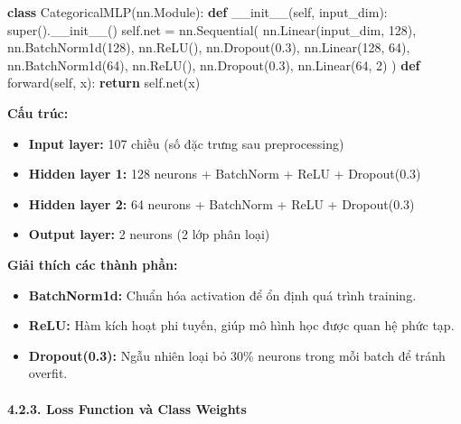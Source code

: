\documentclass[
]{article}
\newenvironment{Shaded}{}{}
\newcommand{\BuiltInTok}[1]{\textcolor[rgb]{0.00,0.50,0.00}{#1}}
\newcommand{\ControlFlowTok}[1]{\textcolor[rgb]{0.00,0.44,0.13}{\textbf{#1}}}
\newcommand{\DecValTok}[1]{\textcolor[rgb]{0.25,0.63,0.44}{#1}}
\newcommand{\FloatTok}[1]{\textcolor[rgb]{0.25,0.63,0.44}{#1}}
\newcommand{\FunctionTok}[1]{\textcolor[rgb]{0.02,0.16,0.49}{#1}}
\newcommand{\KeywordTok}[1]{\textcolor[rgb]{0.00,0.44,0.13}{\textbf{#1}}}
\newcommand{\NormalTok}[1]{#1}
\newcommand{\OperatorTok}[1]{\textcolor[rgb]{0.40,0.40,0.40}{#1}}
\newcommand{\VariableTok}[1]{\textcolor[rgb]{0.10,0.09,0.49}{#1}}
\providecommand{\tightlist}{%
  \setlength{\itemsep}{0pt}\setlength{\parskip}{0pt}}
\begin{document}
\begin{Shaded}
\begin{Highlighting}[]
\KeywordTok{class}\NormalTok{ CategoricalMLP(nn.Module):}
    \KeywordTok{def} \FunctionTok{\_\_init\_\_}\NormalTok{(}\VariableTok{self}\NormalTok{, input\_dim):}
        \BuiltInTok{super}\NormalTok{().}\FunctionTok{\_\_init\_\_}\NormalTok{()}
        \VariableTok{self}\NormalTok{.net }\OperatorTok{=}\NormalTok{ nn.Sequential(}
\NormalTok{            nn.Linear(input\_dim, }\DecValTok{128}\NormalTok{), nn.BatchNorm1d(}\DecValTok{128}\NormalTok{), nn.ReLU(), nn.Dropout(}\FloatTok{0.3}\NormalTok{),}
\NormalTok{            nn.Linear(}\DecValTok{128}\NormalTok{, }\DecValTok{64}\NormalTok{), nn.BatchNorm1d(}\DecValTok{64}\NormalTok{), nn.ReLU(), nn.Dropout(}\FloatTok{0.3}\NormalTok{),}
\NormalTok{            nn.Linear(}\DecValTok{64}\NormalTok{, }\DecValTok{2}\NormalTok{)}
\NormalTok{        )}
    \KeywordTok{def}\NormalTok{ forward(}\VariableTok{self}\NormalTok{, x): }
        \ControlFlowTok{return} \VariableTok{self}\NormalTok{.net(x)}
\end{Highlighting}
\end{Shaded}

\textbf{Cấu trúc:}

\begin{itemize}
\tightlist
\item
  \textbf{Input layer:} 107 chiều (số đặc trưng sau preprocessing)
\item
  \textbf{Hidden layer 1:} 128 neurons + BatchNorm + ReLU + Dropout(0.3)
\item
  \textbf{Hidden layer 2:} 64 neurons + BatchNorm + ReLU + Dropout(0.3)
\item
  \textbf{Output layer:} 2 neurons (2 lớp phân loại)
\end{itemize}

\textbf{Giải thích các thành phần:}

\begin{itemize}
\tightlist
\item
  \textbf{BatchNorm1d:} Chuẩn hóa activation để ổn định quá trình
  training.
\item
  \textbf{ReLU:} Hàm kích hoạt phi tuyến, giúp mô hình học được quan hệ
  phức tạp.
\item
  \textbf{Dropout(0.3):} Ngẫu nhiên loại bỏ 30\% neurons trong mỗi batch
  để tránh overfit.
\end{itemize}

\paragraph{4.2.3. Loss Function và Class
Weights}\label{423-loss-function-vuxe0-class-weights}
\end{document}
